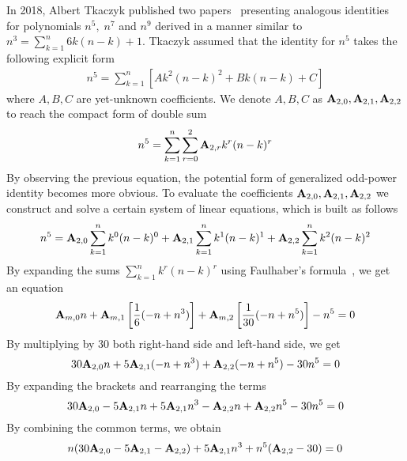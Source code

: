 In 2018, Albert Tkaczyk published two papers~\cite{tkaczyk2018problem, tkaczyk2018continuation}
presenting analogous identities for polynomials $n^5, \; n^7$ and $n^9$
derived in a manner similar to $n^3 = \sum_{k=1}^{n} 6k(n-k) + 1$.
Tkaczyk assumed that the identity for $n^5$ takes the following explicit form
\begin{align*}
    n^5 = \sum_{k=1}^{n} \left[ A k^2(n-k)^2 + Bk(n-k) + C \right]
\end{align*}
where $A,B,C$ are yet-unknown coefficients.
We denote $A,B,C$ as ${\mathbf{A}} \sb{2,0}, {\mathbf{A}} \sb{2,1}, {\mathbf{A}} \sb{2,2}$
to reach the compact form of double sum
\begin{align*}
    n^5 = \sum_{k=1}^{n} \sum_{r=0}^{2} {\mathbf{A}} \sb{2,r} k^r (n-k)^r
\end{align*}
By observing the previous equation, the potential form of generalized odd-power identity becomes more obvious.
To evaluate the coefficients ${\mathbf{A}} \sb{2,0}, {\mathbf{A}} \sb{2,1}, {\mathbf{A}} \sb{2,2}$
we construct and solve a certain system of linear equations, which is
built as follows
\begin{align*}
    n^5 = {\mathbf{A}} \sb{2,0} \sum_{k=1}^{n} k^0 (n-k)^0 + {\mathbf{A}} \sb{2,1} \sum_{k=1}^{n} k^1 (n-k)^1 + {\mathbf{A}} \sb{2,2} \sum_{k=1}^{n} k^2 (n-k)^2
\end{align*}
By expanding the sums $\sum_{k=1}^{n} k^r (n-k)^r$ using Faulhaber's formula~\cite{beardon1996sums}, we get
an equation
\begin{equation*}
    {\mathbf{A}} \sb{m,0} n
    + {\mathbf{A}} \sb{m,1} \left[ \frac{1}{6} (-n + n^3) \right]
    + {\mathbf{A}} \sb{m,2} \left[ \frac{1}{30} (-n + n^5) \right] - n^5 = 0
\end{equation*}
By multiplying by $30$ both right-hand side and left-hand side, we get
\begin{equation*}
    30 {\mathbf{A}} \sb{2,0} n + 5 {\mathbf{A}} \sb{2,1} (-n + n^3) + {\mathbf{A}} \sb{2,2} (-n + n^5) - 30n^5 = 0
\end{equation*}
By expanding the brackets and rearranging the terms
\begin{equation*}
    30 {\mathbf{A}} \sb{2,0} - 5 {\mathbf{A}} \sb{2,1} n + 5 {\mathbf{A}} \sb{2,1} n^3 - {\mathbf{A}} \sb{2,2} n + {\mathbf{A}} \sb{2,2} n^5 - 30n^5 = 0
\end{equation*}
By combining the common terms, we obtain
\begin{equation*}
    n (30 {\mathbf{A}} \sb{2,0} - 5 {\mathbf{A}} \sb{2,1} - {\mathbf{A}} \sb{2,2}) + 5 {\mathbf{A}} \sb{2,1} n^3 + n^5 ({\mathbf{A}} \sb{2,2} - 30) = 0
\end{equation*}
